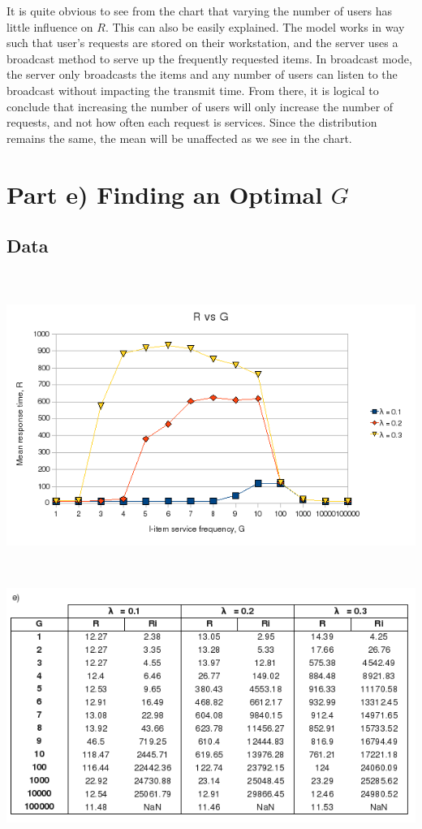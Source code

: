 \documentclass[12pt]{article}
\begin{document}
It is quite obvious to see from the chart that varying the number of users has
little influence on $R$.  This can also be easily explained.  The model works in
way such that user's requests are stored on their workstation, and the server
uses a broadcast method to serve up the frequently requested items.  In
broadcast mode, the server only broadcasts the items and any number of users can
listen to the broadcast without impacting the transmit time.  From there, it is
logical to conclude that increasing the number of users will only increase the
number of requests, and not how often each request is services.  Since the
distribution remains the same, the mean will be unaffected as we see in the
chart.

\section{Part e) Finding an Optimal $G$}
\begin{table}[htp!]
\subsection{Data}
\begin{center}
\includegraphics[height=10cm]{R_vs_G.png}
\includegraphics[height=8cm]{part_e.png}
\end{center}
\end{table}
\end{document}
